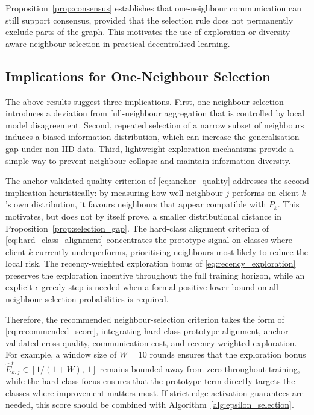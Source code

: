 \documentclass[conference]{IEEEtran}
\newcommand{\rev}[1]{{\color{red}#1}}
\begin{document}
Proposition~\ref{prop:consensus} establishes that one-neighbour communication can still support consensus, provided that the selection rule does not permanently exclude parts of the graph. This motivates the use of exploration or diversity-aware neighbour selection in practical decentralised learning.

\subsection{Implications for One-Neighbour Selection}
\label{subsec:implications-for-one-neighbour-selection}

The above results suggest three implications. First, one-neighbour selection introduces a deviation from full-neighbour aggregation that is controlled by local model disagreement. Second, repeated selection of a narrow subset of neighbours induces a biased information distribution, which can increase the generalisation gap under non-IID data. Third, lightweight exploration mechanisms provide a simple way to prevent neighbour collapse and maintain information diversity.

The anchor-validated quality criterion of \eqref{eq:anchor_quality} addresses the second implication \rev{heuristically}: by measuring how well neighbour \(j\) performs on client \(k\)'s own distribution, it favours neighbours that appear compatible with \(P_k\). \rev{This motivates, but does not by itself prove, a smaller distributional distance in Proposition~\ref{prop:selection_gap}.} The hard-class alignment criterion of \eqref{eq:hard_class_alignment} concentrates the prototype signal on classes where client \(k\) currently underperforms, prioritising neighbours most likely to reduce the local risk. The recency-weighted exploration bonus of \eqref{eq:recency_exploration} preserves the exploration incentive throughout the full training horizon, \rev{while an explicit \(\epsilon\)-greedy step is needed when a formal positive lower bound on all neighbour-selection probabilities is required.}

Therefore, the recommended neighbour-selection criterion takes the form of \eqref{eq:recommended_score}, integrating hard-class prototype alignment, anchor-validated cross-quality, communication cost, and recency-weighted exploration. For example, a window size of $W = 10$ rounds ensures that the exploration bonus \(\hat{E}_{k,j}^t \in [1/(1+W),\, 1]\) remains bounded away from zero throughout training, while the hard-class focus ensures that the prototype term directly targets the classes where improvement matters most. \rev{If strict edge-activation guarantees are needed, this score should be combined with Algorithm~\ref{alg:epsilon_selection}.}
\end{document}
